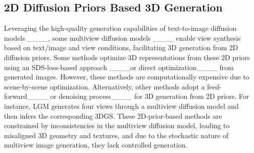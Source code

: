 \subsection{2D Diffusion Priors Based 3D Generation}
\label{sec:related-2d-diffusion}
Leveraging the high-quality generation capabilities of text-to-image diffusion models ____, some multiview diffusion models ____ enable view synthesis based on text/image and view conditions, facilitating 3D generation from 2D diffusion priors. Some methods optimize 3D representations from these 2D priors using an SDS-loss-based approach ____or direct optimization____ from generated images. 
However, these methods are computationally expensive due to scene-by-scene optimization. Alternatively, other methods adopt a feed-forward____ or denoising process____ for 3D generation from 2D priors. For instance, LGM generates four views through a multiview diffusion model and then infers the corresponding 3DGS. These 2D-prior-based methods are constrained by inconsistencies in the multiview diffusion model, leading to misaligned 3D geometry and textures, and due to the stochastic nature of multiview image generation, they lack controlled generation.



